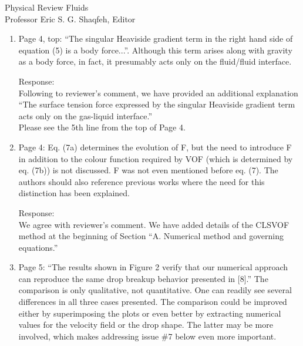 \documentclass{letter}
\begin{document}
\begin{letter}{
Physical Review Fluids\\
Professor Eric S. G. Shaqfeh, Editor\\}
\begin{enumerate}
\par\noindent
\item
\textsf
{Page 4, top: “The singular Heaviside gradient term in the right hand side of
equation (5) is a body force...”. Although this term arises along with gravity
as a body force, in fact, it presumably acts only on the fluid/fluid
interface.}
\vspace{3 mm}

Response: \\
Following to reviewer's comment, we have provided an additional explanation
``The surface tension force expressed by the singular Heaviside gradient term
acts only on the gas-liquid interface.''
\\
Please see the 5th line from the top of Page 4.
\\

\par\noindent
\item
\textsf
{Page 4: Eq. (7a) determines the evolution of F, but the need to introduce F in
addition to the colour function required by VOF (which is determined by eq.
(7b)) is not discussed. F was not even mentioned before eq. (7). The authors
should also reference previous works where the need for this distinction has
been explained.}
\vspace{3 mm}

Response: \\
We agree with reviewer's comment. We have added details of the CLSVOF method at
the beginning of Section ``A. Numerical method and governing equations.''
\\

\par\noindent
\item
\textsf
{Page 5: ``The results shown in Figure 2 verify that our numerical approach can
reproduce the same drop breakup behavior presented in [8].'' The comparison is
only qualitative, not quantitative. One can readily see several differences in
all three cases presented.  The comparison could be improved either by
superimposing the plots or even better by extracting numerical values for the
velocity field or the drop shape. The latter may be more involved, which makes
addressing issue \#7 below even more important.}
\vspace{3 mm}


\end{enumerate}
\end{letter}
\end{document}
